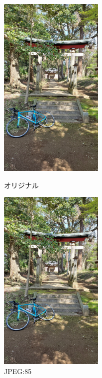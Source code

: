 \documentclass[a4paper,11pt]{bxjsarticle}
\begin{document}
  \begin{figure}[htbp]
    \begin{minipage}{0.5\hsize}
     \begin{center}
      \includegraphics[width=50mm]{sample.jpg}
     \end{center}
     \caption{オリジナル}
     \label{fig:jori}
    \end{minipage}
    \begin{minipage}{0.5\hsize}
     \begin{center}
      \includegraphics[width=50mm]{sample_j85.jpg}
     \end{center}
     \caption{JPEG:85}
     \label{fig:j85}
    \end{minipage}
   \end{figure}
\end{document}
